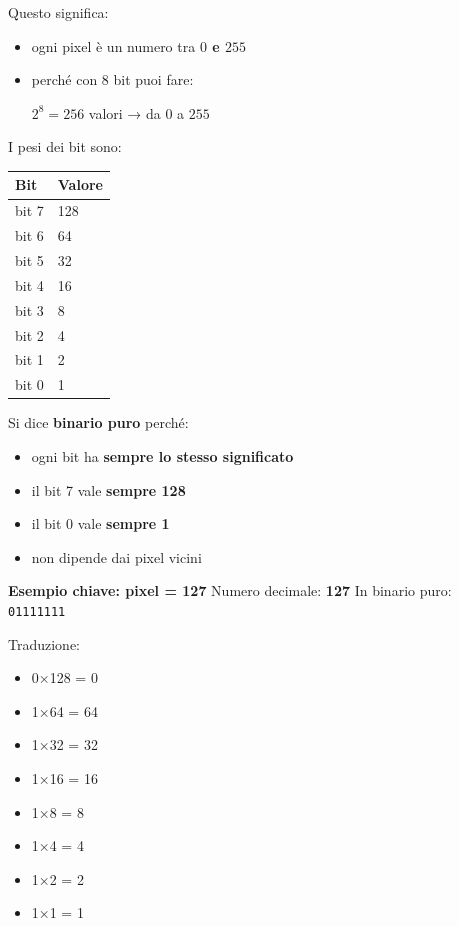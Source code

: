 \documentclass[
]{article}
\providecommand{\tightlist}{%
  \setlength{\itemsep}{0pt}\setlength{\parskip}{0pt}}
\begin{document}
Questo significa:

\begin{itemize}
\item
  ogni pixel è un numero tra \textbf{\(0\) e \(255\)}
\item
  perché con 8 bit puoi fare:

  \(2^8=256\) valori → da \(0\) a \(255\)
\end{itemize}

I pesi dei bit sono:

\begin{longtable}[]{@{}ll@{}}
\toprule\noalign{}
Bit & Valore \\
\midrule\noalign{}
\endhead
\bottomrule\noalign{}
\endlastfoot
bit 7 & 128 \\
bit 6 & 64 \\
bit 5 & 32 \\
bit 4 & 16 \\
bit 3 & 8 \\
bit 2 & 4 \\
bit 1 & 2 \\
bit 0 & 1 \\
\end{longtable}

Si dice \textbf{binario puro} perché:

\begin{itemize}
\tightlist
\item
  ogni bit ha \textbf{sempre lo stesso significato}
\item
  il bit 7 vale \textbf{sempre 128}
\item
  il bit 0 vale \textbf{sempre 1}
\item
  non dipende dai pixel vicini
\end{itemize}

\textbf{Esempio chiave: pixel = 127}
Numero decimale: \textbf{127}
In binario puro: \texttt{01111111}

Traduzione:

\begin{itemize}
\tightlist
\item
  0×128 = 0
\item
  1×64 = 64
\item
  1×32 = 32
\item
  1×16 = 16
\item
  1×8 = 8
\item
  1×4 = 4
\item
  1×2 = 2
\item
  1×1 = 1
\end{itemize}
\end{document}
